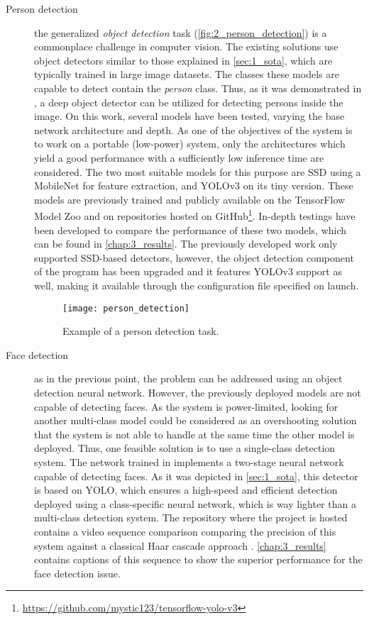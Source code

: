 \begin{description}
	\item[Person detection] the generalized \textit{object detection} task (\autoref{fig:2_person_detection}) is a commonplace challenge in computer vision. The existing solutions use object detectors similar to those explained in \autoref{sec:1_sota}, which are typically trained in large image datasets. The classes these models are capable to detect contain the \textit{person} class. Thus, as it was demonstrated in \cite{tfg}, a deep object detector can be utilized for detecting persons inside the image. On this work, several models have been tested, varying the base network architecture and depth. As one of the objectives of the system is to work on a portable (low-power) system, only the architectures which yield a good performance with a sufficiently low inference time are considered. The two most suitable models for this purpose are SSD \cite{ssd} using a MobileNet \cite{mobilenet} for feature extraction, and YOLOv3 \cite{yolov3} on its tiny version. These models are previously trained and publicly available on the TensorFlow Model Zoo \cite{model_zoo} and on repositories hosted on GitHub\footnote{\url{https://github.com/mystic123/tensorflow-yolo-v3}}. In-depth testings have been developed to compare the performance of these two models, which can be found in \autoref{chap:3_results}. The previously developed work \cite{tfg} only supported SSD-based detectors, however, the object detection component of the program has been upgraded and it features YOLOv3 support as well, making it available through the configuration file specified on launch.
	
\begin{figure}[h]
	\centering
	\texttt{[image: person\_detection]}
	\caption{Example of a person detection task.}
	\label{fig:2_person_detection}
\end{figure}
	
	\item[Face detection] as in the previous point, the problem can be addressed using an object detection neural network. However, the previously deployed models are not capable of detecting faces. As the system is power-limited, looking for another multi-class model could be considered as an overshooting solution that the system is not able to handle at the same time the other model is deployed. Thus, one feasible solution is to use a single-class detection system. The network trained in \cite{faced} implements a two-stage neural network capable of detecting faces. As it was depicted in \autoref{sec:1_sota}, this detector is based on YOLO, which ensures a high-speed and efficient detection deployed using a class-specific neural network, which is way lighter than a multi-class detection system. The repository where the project is hosted contains a video sequence comparison comparing the precision of this system against a classical Haar cascade approach \cite{violajones}. \autoref{chap:3_results} contains captions of this sequence to show the superior performance for the face detection issue.
	

\end{description}
